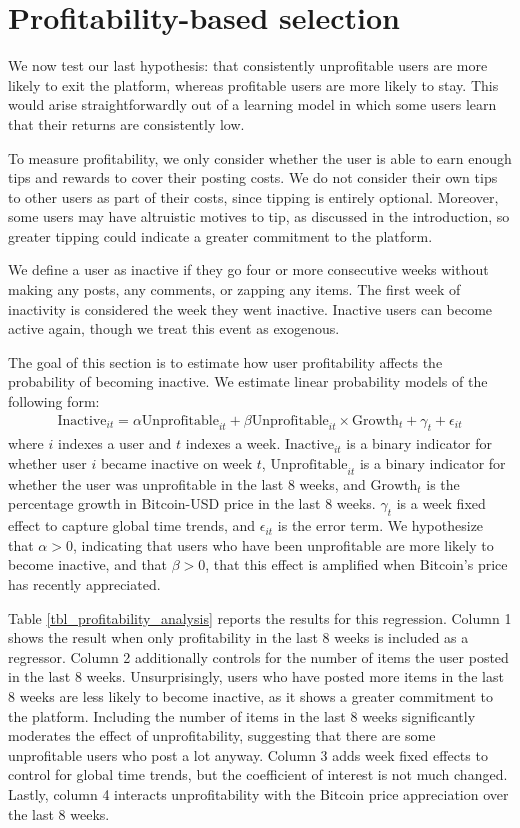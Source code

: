 \section{Profitability-based selection}

We now test our last hypothesis: that consistently unprofitable users are more likely to exit the platform, whereas profitable users are more likely to stay. This would arise straightforwardly out of a learning model in which some users learn that their returns are consistently low.

To measure profitability, we only consider whether the user is able to earn enough tips and rewards to cover their posting costs. We do not consider their own tips to other users as part of their costs, since tipping is entirely optional. Moreover, some users may have altruistic motives to tip, as discussed in the introduction, so greater tipping could indicate a greater commitment to the platform.

We define a user as inactive if they go four or more consecutive weeks without making any posts, any comments, or zapping any items. The first week of inactivity is considered the week they went inactive. Inactive users can become active again, though we treat this event as exogenous. 

The goal of this section is to estimate how user profitability affects the probability of becoming inactive. We estimate linear probability models of the following form:
\begin{align}
\text{Inactive}_{it} = \alpha \text{Unprofitable}_{it} + \beta \text{Unprofitable}_{it} \times \text{Growth}_{t} + \gamma_{t} + \epsilon_{it}
\end{align}
where $i$ indexes a user and $t$ indexes a week. $\text{Inactive}_{it}$ is a binary indicator for whether user $i$ became inactive on week $t$, $\text{Unprofitable}_{it}$ is a binary indicator for whether the user was unprofitable in the last 8 weeks, and $\text{Growth}_{t}$ is the percentage growth in Bitcoin-USD price in the last 8 weeks. $\gamma_{t}$ is a week fixed effect to capture global time trends, and $\epsilon_{it}$ is the error term. We hypothesize that $\alpha>0$, indicating that users who have been unprofitable are more likely to become inactive, and that $\beta>0$, that this effect is amplified when Bitcoin's price has recently appreciated.

Table \ref{tbl_profitability_analysis} reports the results for this regression. Column 1 shows the result when only profitability in the last 8 weeks is included as a regressor. Column 2 additionally controls for the number of items the user posted in the last 8 weeks. Unsurprisingly, users who have posted more items in the last 8 weeks are less likely to become inactive, as it shows a greater commitment to the platform. Including the number of items in the last 8 weeks significantly moderates the effect of unprofitability, suggesting that there are some unprofitable users who post a lot anyway. Column 3 adds week fixed effects to control for global time trends, but the coefficient of interest is not much changed. Lastly, column 4 interacts unprofitability with the Bitcoin price appreciation over the last 8 weeks. 


